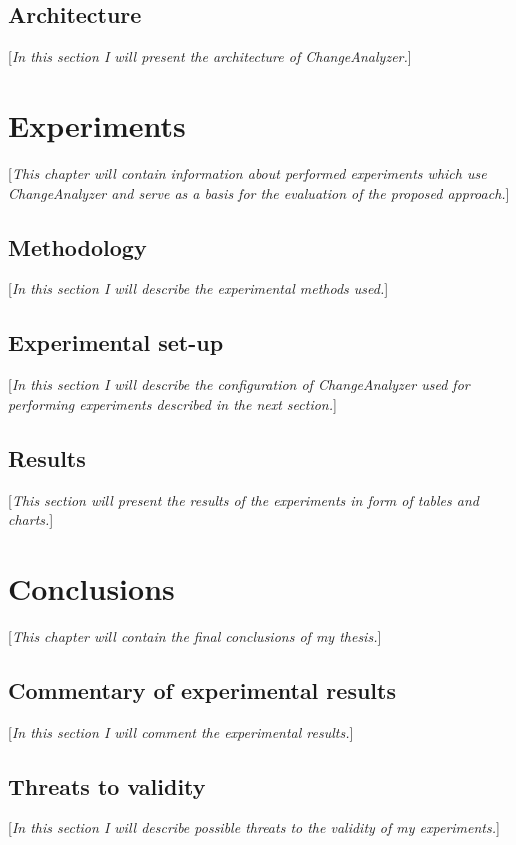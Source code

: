 \documentclass{pracamgr}
\begin{document}
\section{Architecture}
\label{sec:architecture}
[\textit{In this section I will present the architecture of ChangeAnalyzer.}]

\chapter{Experiments}
\label{cha:experiments}
[\textit{This chapter will contain information about performed experiments which use ChangeAnalyzer and serve as a basis for the evaluation of the proposed approach.}]

\section{Methodology}
\label{sec:methodology}
[\textit{In this section I will describe the experimental methods used.}]

\section{Experimental set-up}
\label{sec:set-up}
[\textit{In this section I will describe the configuration of ChangeAnalyzer used for performing experiments described in the next section.}]

\section{Results}
\label{sec:results}
[\textit{This section will present the results of the experiments in form of tables and charts.}]

\chapter{Conclusions}
\label{cha:conclusions}
[\textit{This chapter will contain the final conclusions of my thesis.}]

\section{Commentary of experimental results}
\label{sec:commentary}
[\textit{In this section I will comment the experimental results.}]

\section{Threats to validity}
\label{sec:threats}
[\textit{In this section I will describe possible threats to the validity of my experiments.}]
\end{document}
